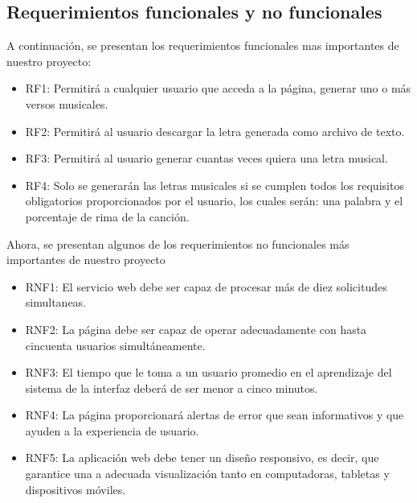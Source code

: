 \documentclass[12pt, a4paper, titlepage]{report}
\begin{document}
		\subsection{Requerimientos funcionales y no funcionales}
		A continuación, se presentan los requerimientos funcionales mas importantes de nuestro proyecto:
		\begin{itemize}
			\item RF1: Permitirá a cualquier usuario que acceda a la página, generar uno o más versos musicales.
			\item RF2: Permitirá al usuario descargar la letra generada como archivo de texto.
			\item RF3: Permitirá al usuario generar cuantas veces quiera una letra musical.
			\item RF4: Solo se generarán las letras musicales si se cumplen todos los requisitos obligatorios proporcionados por el usuario, los cuales serán: una palabra y el porcentaje de rima de la canción.
		\end{itemize}
		Ahora, se presentan algunos de los requerimientos no funcionales más importantes de nuestro proyecto
		\begin{itemize}
			\item RNF1: El servicio web debe ser capaz de procesar más de diez solicitudes simultaneas.
			\item RNF2: La página debe ser capaz de operar adecuadamente con hasta cincuenta usuarios simultáneamente.
			\item RNF3: El tiempo que le toma a un usuario promedio en el aprendizaje del sistema de la interfaz deberá de ser menor a cinco minutos.
			\item RNF4: La página proporcionará alertas de error que sean informativos y que ayuden a la experiencia de usuario.
			\item RNF5: La aplicación web debe tener un diseño responsivo, es decir, que garantice una a adecuada visualización tanto en computadoras, tabletas y dispositivos móviles.
		\end{itemize}
	\newpage
\end{document}
